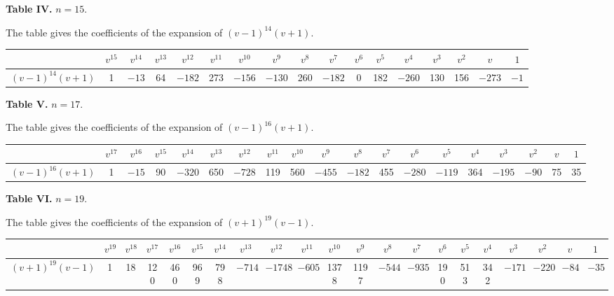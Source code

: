 \documentclass[11pt,a4paper]{book}
\begin{document}
\medskip

\noindent\textbf{Table IV.} $n = 15$.

\medskip

\noindent
The table gives the coefficients of the expansion of $(v-1)^{14}(v+1)$.

\begin{center}
\begin{tabular}{|c|c|c|c|c|c|c|c|c|c|c|c|c|c|c|c|c|}
\hline
& $v^{15}$ & $v^{14}$ & $v^{13}$ & $v^{12}$ & $v^{11}$ & $v^{10}$ & $v^9$ & $v^8$ & $v^7$ & $v^6$ & $v^5$ & $v^4$ & $v^3$ & $v^2$ & $v$ & $1$ \\
\hline
$(v-1)^{14}(v+1)$ & 1 & $-13$ & 64 & $-182$ & 273 & $-156$ & $-130$ & 260 & $-182$ & 0 & 182 & $-260$ & 130 & 156 & $-273$ & $-1$ \\
\hline
\end{tabular}
\end{center}

\medskip

\noindent\textbf{Table V.} $n = 17$.

\medskip

\noindent
The table gives the coefficients of the expansion of $(v-1)^{16}(v+1)$.

\begin{center}
\begin{tabular}{|c|c|c|c|c|c|c|c|c|c|c|c|c|c|c|c|c|c|c|}
\hline
& $v^{17}$ & $v^{16}$ & $v^{15}$ & $v^{14}$ & $v^{13}$ & $v^{12}$ & $v^{11}$ & $v^{10}$ & $v^9$ & $v^8$ & $v^7$ & $v^6$ & $v^5$ & $v^4$ & $v^3$ & $v^2$ & $v$ & $1$ \\
\hline
$(v-1)^{16}(v+1)$ & 1 & $-15$ & 90 & $-320$ & 650 & $-728$ & 119 & 560 & $-455$ & $-182$ & 455 & $-280$ & $-119$ & 364 & $-195$ & $-90$ & 75 & 35 \\
\hline
\end{tabular}
\end{center}

\medskip

\noindent\textbf{Table VI.} $n = 19$.

\medskip

\noindent
The table gives the coefficients of the expansion of $(v+1)^{19}(v-1)$.

\begin{center}
\begin{tabular}{|c|c|c|c|c|c|c|c|c|c|c|c|c|c|c|c|c|c|c|c|c|}
\hline
& $v^{19}$ & $v^{18}$ & $v^{17}$ & $v^{16}$ & $v^{15}$ & $v^{14}$ & $v^{13}$ & $v^{12}$ & $v^{11}$ & $v^{10}$ & $v^9$ & $v^8$ & $v^7$ & $v^6$ & $v^5$ & $v^4$ & $v^3$ & $v^2$ & $v$ & $1$ \\
\hline
$(v+1)^{19}(v-1)$ & 1 & 18 & 120 & 460 & 969 & 798 & $-714$ & $-1748$ & $-605$ & 1378 & 1197 & $-544$ & $-935$ & 190 & 513 & 342 & $-171$ & $-220$ & $-84$ & $-35$ \\
\hline
\end{tabular}
\end{center}
\end{document}
